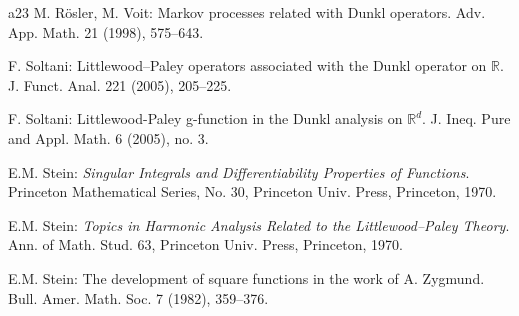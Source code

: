 \documentclass[11pt,a4paper]{article}
\def\R{\mathbb{R}}
\theoremstyle{definition}\newtheorem{remark}[theorem]{Remark}
\begin{document}
\begin{thebibliography}{a23}
M. R\"{o}sler, M. Voit: Markov processes related with Dunkl operators. Adv. App. Math. 21 (1998), 575--643.

F. Soltani: Littlewood--Paley operators associated with the Dunkl operator on $\R$. J. Funct. Anal. 221 (2005), 205--225.

F. Soltani: Littlewood-Paley g-function in the Dunkl analysis on $\R^d$. J. Ineq. Pure and Appl. Math. 6 (2005), no. 3.

E.M. Stein: \emph{Singular Integrals and Differentiability Properties of Functions}. Princeton Mathematical Series, No. 30, Princeton
Univ. Press, Princeton, 1970.

E.M. Stein: \emph{Topics in Harmonic Analysis Related to the Littlewood--Paley Theory}. Ann. of Math. Stud. 63, Princeton
    Univ. Press, Princeton, 1970.

E.M. Stein: The development of square functions in the work of A. Zygmund. Bull. Amer. Math. Soc. 7 (1982), 359--376.
\end{thebibliography}
\end{document}
